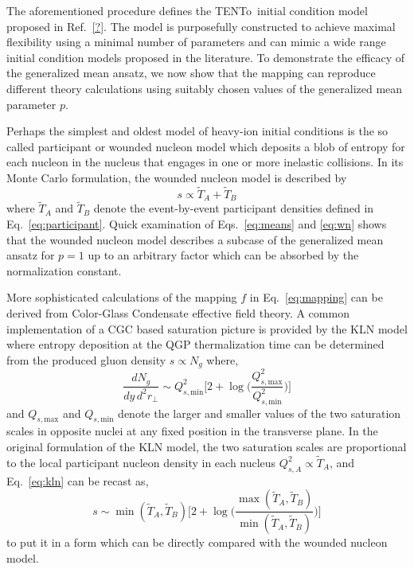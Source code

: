 \documentclass[aps,prc,reprint,amsmath,nofootinbib,superscriptaddress]{revtex4-1}
\newcommand{\trento}{T\raisebox{-0.5ex}{R}ENTo}
\newcommand{\T}{\tilde{T}}
\newcommand{\Qs}[1]{Q_{s,\text{#1}}}
\begin{document}
The aforementioned procedure defines the \trento\ initial condition model proposed in Ref.~\ref{?}.
The model is purposefully constructed to achieve maximal flexibility using a minimal number of parameters and can mimic a wide range initial condition models proposed in the literature.
To demonstrate the efficacy of the generalized mean ansatz, we now show that the mapping can reproduce different theory calculations using suitably chosen values of the generalized mean parameter $p$.

Perhaps the simplest and oldest model of heavy-ion initial conditions is the so called participant or wounded nucleon model which deposits a blob of entropy for each nucleon in the nucleus that engages in one or more inelastic collisions.
In its Monte Carlo formulation, the wounded nucleon model is described by
\begin{equation}
  s \propto \T_A + \T_B
  \label{eq:wn}
\end{equation}
where $\T_A$ and $\T_B$ denote the event-by-event participant densities defined in Eq.~\eqref{eq:participant}.
Quick examination of Eqs.~\eqref{eq:means} and \eqref{eq:wn} shows that the wounded nucleon model describes a subcase of the generalized mean ansatz for $p=1$ up to an arbitrary factor which can be absorbed by the normalization constant.

More sophisticated calculations of the mapping $f$ in Eq.~\eqref{eq:mapping} can be derived from Color-Glass Condensate effective field theory.
A common implementation of a CGC based saturation picture is provided by the KLN model where entropy deposition at the QGP thermalization time can be determined from the produced gluon density $s \propto N_g$ where,
\begin{equation}
  \frac{dN_g}{dy\,d^2r_\perp} \sim \Qs{min}^2 \biggl[
    2 + \log \biggl(\frac{\Qs{max}^2}{\Qs{min}^2} \biggr)
  \biggr]
  \label{eq:kln}
\end{equation}
and $\Qs{max}$ and $\Qs{min}$ denote the larger and smaller values of the two saturation scales in opposite nuclei at any fixed position in the transverse plane.
In the original formulation of the KLN model, the two saturation scales are proportional to the local participant nucleon density in each nucleus $Q^2_{s,A} \propto \T_A$, and Eq.~\eqref{eq:kln} can be recast as,
\begin{equation}
  s \sim \min(\T_A, \T_B) \biggl[
    2 + \log \biggl(\frac{\max(\T_A,\T_B)}{\min(\T_A,\T_B)}\biggr)
  \biggr]
\end{equation}
to put it in a form which can be directly compared with the wounded nucleon model.
\end{document}
